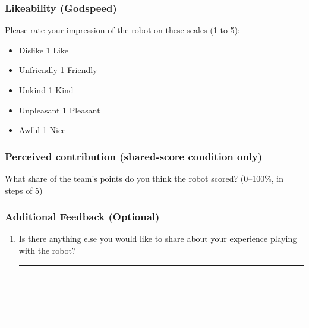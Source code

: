 \subsubsection{Likeability (Godspeed)}
Please rate your impression of the robot on these scales (1 to 5):
\begin{itemize}[leftmargin=*, nosep]
    \item Dislike \hfill 1     \hfill Like
    \item Unfriendly \hfill 1     \hfill Friendly
    \item Unkind \hfill 1     \hfill Kind
    \item Unpleasant \hfill 1     \hfill Pleasant
    \item Awful \hfill 1     \hfill Nice
\end{itemize}

\subsubsection{Perceived contribution (shared-score condition only)}
What share of the team's points do you think the robot scored? (0--100\%, in steps of 5)


\subsubsection{Additional Feedback (Optional)}

\begin{enumerate}[leftmargin=*, itemsep=0.8em, start=10]

    \item Is there anything else you would like to share about your experience playing with the robot?

    \vspace{0.5em}
    \rule{\linewidth}{0.4pt}\\[1.5em]
    \rule{\linewidth}{0.4pt}\\[1.5em]
    \rule{\linewidth}{0.4pt}

\end{enumerate}

\clearpage
